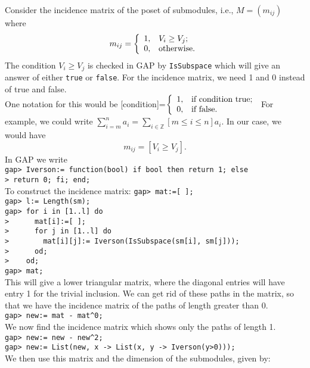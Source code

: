 \documentclass[12pt]{amsart}
\theoremstyle{definition}
\begin{document}
Consider the incidence matrix of the poset of submodules, i.e., $M=(m_{ij})$ where
$$m_{ij}=\left\{\begin{array}{ll}
1, & \hbox{$V_i\geq V_j$;} \\
0, & \hbox{otherwise.}
\end{array}\right.$$
The condition $V_i\geq V_j$ is checked in GAP by \verb"IsSubspace" which will give an answer of either \verb"true" or \verb"false".  For the incidence matrix, we need 1 and 0 instead of true and false.\\
One notation for this would be [condition]=$\left\{\begin{array}{ll} 1, & \hbox{if condition true;} \\ 0, & \hbox{if false.}\end{array}\right.$ For example, we could write $\sum_{i=m}^n a_i=\sum_{i\in\mathbb{Z}}[m\leq i\leq n]a_i$.  In our case, we would have
$$m_{ij}=[V_i\geq V_j].$$
In GAP we write\\
\verb"gap> Iverson:= function(bool) if bool then return 1; else"\\
\verb"> return 0; fi; end;"\\
To construct the incidence matrix:
\verb"gap> mat:=[ ];"\\
\verb"gap> l:= Length(sm);"\\
\verb"gap> for i in [1..l] do"\\
\verb">      mat[i]:=[ ];"\\
\verb">      for j in [1..l] do"\\
\verb">        mat[i][j]:= Iverson(IsSubspace(sm[i], sm[j]));"\\
\verb">      od;"\\
\verb">    od;"\\
\verb"gap> mat;"\\
This will give a lower triangular matrix, where the diagonal entries will have entry 1 for the trivial inclusion.  We can get rid of these paths in the matrix, so that we have the incidence matrix of the paths of length greater than 0.\\
\verb"gap> new:= mat - mat^0;"\\
We now find the incidence matrix which shows only the paths of length 1.\\
\verb"gap> new:= new - new^2;"\\
\verb"gap> new:= List(new, x -> List(x, y -> Iverson(y>0)));"\\
We then use this matrix and the dimension of the submodules, given by:\\
\end{document}
